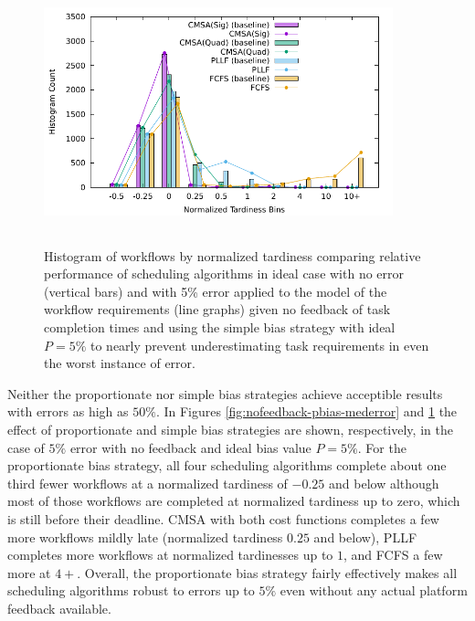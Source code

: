\documentclass[10pt]{csce}
\begin{document}
\begin{figure}
	\begin{center}
		\includegraphics[width=0.9\textwidth,height=3in]{figures/Histogram_All_CompleteMediumAllUniformError_WithBias.pdf}
	\end{center}
	\caption{Histogram of workflows by normalized tardiness comparing
		relative performance of scheduling algorithms in ideal case with no
		error (vertical bars) and with 5\% error applied to the model of the
		workflow requirements (line graphs) given no feedback of task
		completion times and using the simple bias strategy with ideal
		$P=5\%$ to nearly prevent underestimating task requirements in even the
		worst instance of error.}
	\label{fig:nofeedback-sbias-mederror}
\end{figure}

Neither the proportionate nor simple bias strategies achieve acceptible
results with errors as high as $50\%$.  In Figures
\ref{fig:nofeedback-pbias-mederror} and \ref{fig:nofeedback-sbias-mederror}
the effect of proportionate and simple bias strategies are shown, respectively,
in the case of $5\%$ error with no feedback and ideal bias value $P=5\%$.
For the proportionate bias strategy, all four scheduling algorithms complete
about one third fewer workflows at a normalized tardiness of $-0.25$ and below
although most of those workflows are completed at normalized tardiness up to
zero, which is still before their deadline.  CMSA with both cost functions completes
a few more workflows mildly late (normalized tardiness $0.25$ and below), PLLF
completes more workflows at normalized tardinesses up to $1$, and FCFS a few
more at $4+$.  Overall, the proportionate bias strategy fairly effectively
makes all scheduling algorithms robust to errors up to $5\%$ even without any
actual platform feedback available.
\end{document}
